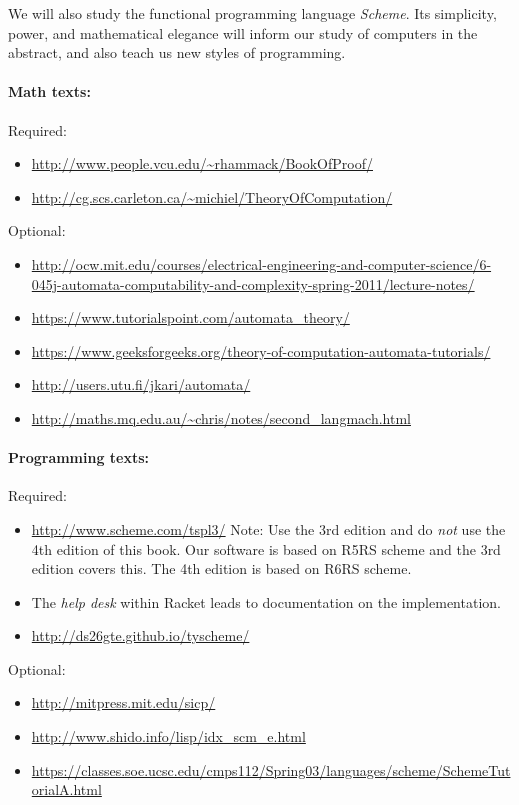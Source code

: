 \documentclass{article}
\begin{document}
  We will also study the functional programming language {\em Scheme}.
  Its simplicity, power, and mathematical elegance will inform our
  study of computers in the abstract, and also teach us new styles of
  programming.


  \paragraph{Math texts:} \mbox{}

  Required:
\begin{itemize}
\item \url{http://www.people.vcu.edu/~rhammack/BookOfProof/}
\item \url{http://cg.scs.carleton.ca/~michiel/TheoryOfComputation/}
\end{itemize}
 Optional:
\begin{itemize}
\item {\tiny \url{http://ocw.mit.edu/courses/electrical-engineering-and-computer-science/6-045j-automata-computability-and-complexity-spring-2011/lecture-notes/}}
\item
 \url{https://www.tutorialspoint.com/automata_theory/}
\item
 \url{https://www.geeksforgeeks.org/theory-of-computation-automata-tutorials/}
\item
 \url{http://users.utu.fi/jkari/automata/}
\item
 \url{http://maths.mq.edu.au/~chris/notes/second_langmach.html}
\end{itemize} 
\paragraph{Programming texts:} \mbox{}

Required:
\begin{itemize}
\item
  \url{http://www.scheme.com/tspl3/}  Note: Use the 3rd edition
  and do {\em not} use the
  4th edition of this book.  Our software is based on R5RS scheme and
  the 3rd edition covers this.  The 4th edition is based on R6RS scheme.
\item
 The {\em help desk} within Racket leads to documentation on
    the implementation.
\item
      \url{http://ds26gte.github.io/tyscheme/} 
\end{itemize}
    Optional:
\begin{itemize}
\item
    \url{http://mitpress.mit.edu/sicp/}
\item
  \url{http://www.shido.info/lisp/idx_scm_e.html}
\item
  \url{https://classes.soe.ucsc.edu/cmps112/Spring03/languages/scheme/SchemeTutorialA.html}
\end{itemize}
\end{document}
